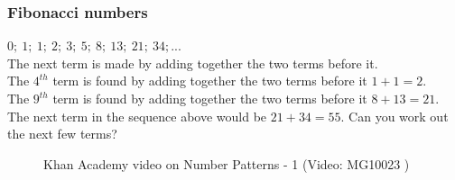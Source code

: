 \subsubsection*{Fibonacci numbers}
$0;~1;~1;~2;~3;~5;~8;~13;~21;~34;...$\\
The next term is made by adding together the two terms before it.\\
The $4^{th}$ term is found by adding together the two terms before it $1+1=2$.\\
The $9^{th}$ term is found by adding together the two terms before it $8+13=21$.\\
The next term in the sequence above would be $21+34=55$.
Can you work out the next few terms?

\setcounter{subfigure}{0}
\begin{figure}[H] 
\textnormal{Khan Academy video on Number Patterns - 1}\vspace{.1in} \nopagebreak
{} { (Video:  MG10023 )}
\end{figure}       

